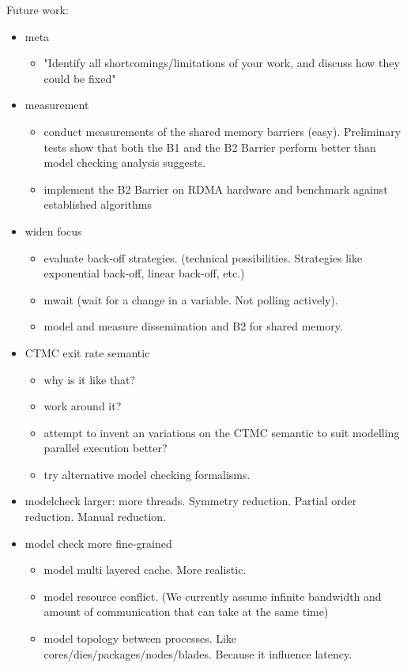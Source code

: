\documentclass[a4paper, 10pt]{article}
\begin{document}
Future work:
\begin{itemize}
	\item meta
		\begin{itemize}
			\item "Identify all shortcomings/limitations of your work, and discuss how they could be fixed"
		\end{itemize}
	\item measurement
		\begin{itemize}
			\item conduct measurements of the shared memory barriers (easy). Preliminary tests show that both the B1 and the B2 Barrier perform better than model checking analysis suggests.
			\item implement the B2 Barrier on RDMA hardware and benchmark against established algorithms
		\end{itemize}
	\item widen focus
		\begin{itemize}
			\item evaluate back-off strategies. (technical possibilities. Strategies like exponential back-off, linear back-off, etc.)
			\item mwait (wait for a change in a variable. Not polling actively).
			\item model and measure dissemination and B2 for shared memory.
		\end{itemize}
	\item CTMC exit rate semantic
		\begin{itemize}
			\item why is it like that?
			\item work around it?
			\item attempt to invent an variations on the CTMC semantic to suit modelling parallel execution better?
			\item try alternative model checking formalisms.
		\end{itemize}
	\item modelcheck larger: more threads. Symmetry reduction. Partial order reduction. Manual reduction.
	\item model check more fine-grained
		\begin{itemize}
			\item model multi layered cache. More realistic.
			\item model resource conflict. (We currently assume infinite bandwidth and amount of communication that can take at the same time)
			\item model topology between processes. Like cores/dies/packages/nodes/blades. Because it influence latency.

\end{itemize}
\end{itemize}
\end{document}
